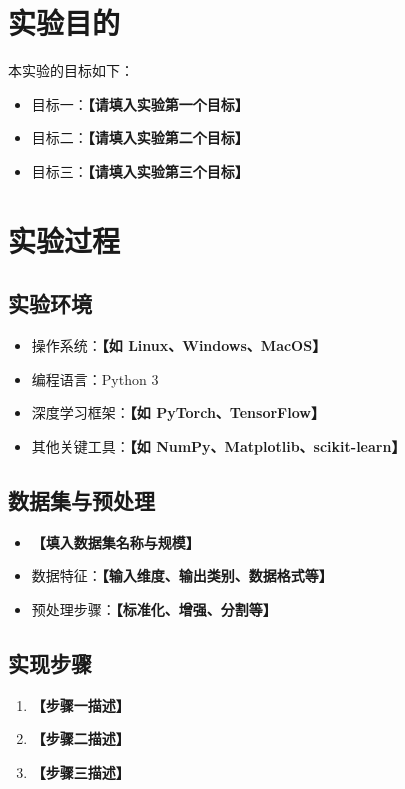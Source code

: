 \documentclass[12pt,a4paper]{ctexart}
\title{\reporttitle}
\author{\authname：\underline{\hspace{3cm}} \quad \authid：\underline{\hspace{3cm}} \quad \class：\underline{\hspace{3cm}}}
\date{\today}
\begin{document}
\maketitle
\tableofcontents
\newpage

\section{实验目的}
本实验的目标如下：
\begin{itemize}
  \item 目标一：\textbf{【请填入实验第一个目标】}
  \item 目标二：\textbf{【请填入实验第二个目标】}
  \item 目标三：\textbf{【请填入实验第三个目标】}
\end{itemize}

\section{实验过程}
\subsection{实验环境}
\begin{itemize}
  \item 操作系统：\textbf{【如 Linux、Windows、MacOS】}
  \item 编程语言：Python 3
  \item 深度学习框架：\textbf{【如 PyTorch、TensorFlow】}
  \item 其他关键工具：\textbf{【如 NumPy、Matplotlib、scikit-learn】}
\end{itemize}

\subsection{数据集与预处理}
\begin{itemize}
  \item \textbf{【填入数据集名称与规模】}
  \item 数据特征：\textbf{【输入维度、输出类别、数据格式等】}
  \item 预处理步骤：\textbf{【标准化、增强、分割等】}
\end{itemize}

\subsection{实现步骤}
\begin{enumerate}
  \item \textbf{【步骤一描述】}
  \item \textbf{【步骤二描述】}
  \item \textbf{【步骤三描述】}
\end{enumerate}
\end{document}
